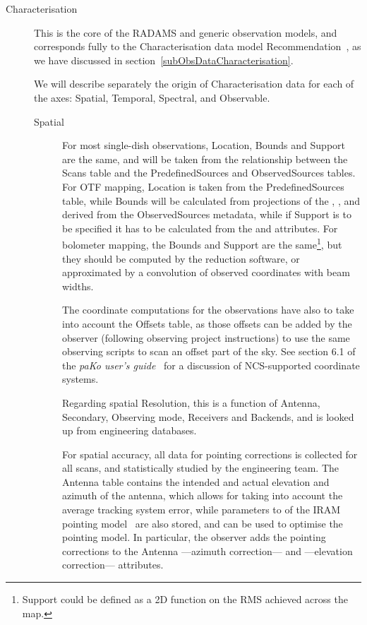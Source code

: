 \begin{description}
				\item[Characterisation] This is the core of the
				RADAMS and generic observation models, and
				corresponds fully to the Characterisation data
				model Recommendation~\cite{2008dmadcrept.....L},
				as we have discussed in
				section~\ref{subObsDataCharacterisation}.
				
				We will describe separately the origin of
				Characterisation data for each of the axes:
				Spatial, Temporal, Spectral, and Observable.
				
				\begin{description}
					\item[Spatial] For most single-dish
					observations, Location, Bounds and Support
					are the same, and will be taken from the
					relationship between the Scans table and
					the PredefinedSources and ObservedSources
					tables. For OTF mapping, Location is
					taken from the PredefinedSources table,
					while Bounds will be calculated from
					projections of the ,
					,  and
					 derived from the ObservedSources
					metadata, while if Support is to be specified
					it has to be calculated from the  
					and  attributes. For bolometer
					mapping, the Bounds and Support are the
					same\footnote{Support could be defined as a
					2D function on the RMS achieved across the map.},
					but they should be computed by the reduction
					software, or approximated by a convolution of
					observed coordinates  with beam widths.
					
					The coordinate computations for the observations
					have also to take into account the Offsets table,
					as those offsets can be added by the observer
					(following observing project instructions) to 
					use the same observing scripts to scan an offset
					part of the sky. See section 6.1 of the
					\emph{paKo user's
					guide}~\cite{2007pako.iram..109U} for a
					discussion of NCS-supported coordinate systems.
					
					Regarding spatial Resolution, this is a function
					of Antenna, Secondary, Observing mode, Receivers
					and Backends, and is looked up from engineering
					databases.
					
					For spatial accuracy, all data for pointing
					corrections is collected for all scans, and
					statistically studied by the engineering team.
					The Antenna table contains the intended and
					actual elevation and azimuth of the antenna,
					which allows for taking into account the
					average tracking system error, while parameters
					 to  of the IRAM pointing
					model~\cite{2000SPIE.4015..632P} are also stored,
					and can be used to optimise the pointing model.
					In particular, the observer adds the pointing
					corrections to the Antenna  ---azimuth
					correction--- and  ---elevation
					correction--- attributes.
					

\end{description}
\end{description}
